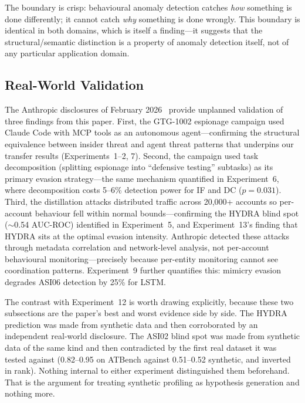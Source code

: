 \documentclass[conference]{IEEEtran}
\begin{document}
The boundary is crisp: behavioural anomaly detection catches \textit{how} something is done differently; it cannot catch \textit{why} something is done wrongly. This boundary is identical in both domains, which is itself a finding---it suggests that the structural/semantic distinction is a property of anomaly detection itself, not of any particular application domain.

\subsection{Real-World Validation}

The Anthropic disclosures of February 2026~\cite{anthropic2026distillation} provide unplanned validation of three findings from this paper. First, the GTG-1002 espionage campaign used Claude Code with MCP tools as an autonomous agent---confirming the structural equivalence between insider threat and agent threat patterns that underpins our transfer results (Experiments~1--2, 7). Second, the campaign used task decomposition (splitting espionage into ``defensive testing'' subtasks) as its primary evasion strategy---the same mechanism quantified in Experiment~6, where decomposition costs 5--6\% detection power for IF and DC ($p{=}0.031$). Third, the distillation attacks distributed traffic across 20,000+ accounts so per-account behaviour fell within normal bounds---confirming the HYDRA blind spot (${\sim}$0.54 AUC-ROC) identified in Experiment~5, and Experiment~13's finding that HYDRA sits at the optimal evasion intensity. Anthropic detected these attacks through metadata correlation and network-level analysis, not per-account behavioural monitoring---precisely because per-entity monitoring cannot see coordination patterns. Experiment~9 further quantifies this: mimicry evasion degrades ASI06 detection by 25\% for LSTM.

The contrast with Experiment~12 is worth drawing explicitly, because these two subsections are the paper's best and worst evidence side by side. The HYDRA prediction was made from synthetic data and then corroborated by an independent real-world disclosure. The ASI02 blind spot was made from synthetic data of the same kind and then contradicted by the first real dataset it was tested against (0.82--0.95 on ATBench against 0.51--0.52 synthetic, and inverted in rank). Nothing internal to either experiment distinguished them beforehand. That is the argument for treating synthetic profiling as hypothesis generation and nothing more.
\end{document}
